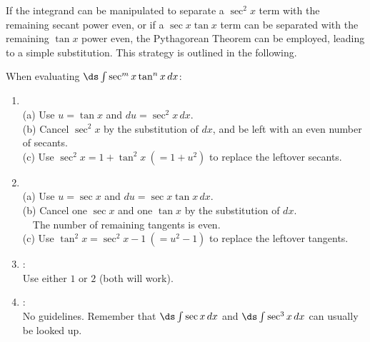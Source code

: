 If the integrand can be manipulated to separate a $\sec^2x$ term with the remaining secant power even, or if a $\sec x\tan x$ term can be separated with the remaining $\tan x$ power even, the Pythagorean Theorem can be employed, leading to a simple substitution. This strategy is outlined in the following.







\begin{formulabox}
	When evaluating $\ds\int\sec^mx \tan^nx\,dx$:  
	\begin{enumerate}
	\item {}\\  
		(a) Use $u=\tan x$ and $du=\sec^2 x\,dx$.\\  
		(b) Cancel $\sec^2 x$ by the substitution of $dx$, and be left with an even number of secants.\\  
		(c) Use $\sec^2x=1+\tan^2x~(=1+u^2)$ to replace the leftover secants.  
	\item {}\\  
		(a) Use $u=\sec x$ and $du=\sec x\tan x\,dx$.\\  
		(b) Cancel one $\sec x$ and one $\tan x$ by the substitution of $dx$.\\  
		\quad~~The number of remaining tangents is even.\\  
		(c) Use $\tan^2x=\sec^2x-1~(=u^2-1)$ to replace the leftover tangents.  
	\item {}:\\ Use either $1$ or $2$ (both will work).  
	\item {}:\\  
	 No guidelines. Remember that $\ds\int\sec x\,dx$ and $\ds\int\sec^3 x\,dx$ can usually be looked up.
	\end{enumerate}
\end{formulabox}

